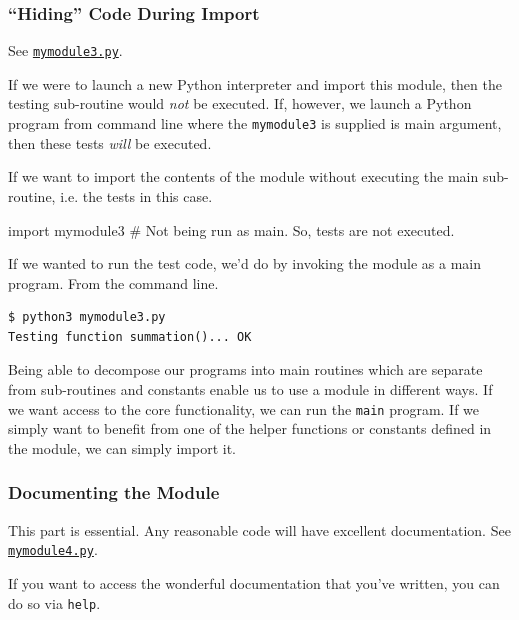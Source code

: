 \documentclass[12pt,letterpaper,twoside]{article}
\begin{document}
\begin{enumerate}
\subsubsection{``Hiding'' Code During Import}

See 
\href{https://github.com/CME211/notes/blob/fall_18/lecture-05/mymodule3.py}
{\texttt{mymodule3.py}}.



If we were to launch a new Python interpreter and import this module,
then the testing sub-routine would \emph{not} be executed. If, however, we launch
a Python program from command line where the \texttt{mymodule3} is supplied is main argument,
then these tests \emph{will} be executed.

If we want to import the contents of the module without executing the main sub-routine, i.e.
the tests in this case.

\begin{python}
import mymodule3    # Not being run as main. So, tests are not executed.
\end{python}

If we wanted to run the test code, we'd do by invoking the module as a main program.
From the command line.

\begin{verbatim}
$ python3 mymodule3.py
Testing function summation()... OK
\end{verbatim}

Being able to decompose our programs into main routines which are separate from sub-routines
and constants enable us to use a module in different ways. If we want access to the core 
functionality, we can run the \texttt{main} program. If we simply want to benefit from
one of the helper functions or constants defined in the module, we can simply
import it.

\subsubsection{Documenting the Module}
This part is essential. Any reasonable code will have excellent documentation.
See 
\href{https://github.com/CME211/notes/blob/fall_18/lecture-05/mymodule4.py}{\texttt{mymodule4.py}}.



If you want to access the wonderful documentation that you've written, you can do so via 
\texttt{help}.


\end{enumerate}
\end{document}
